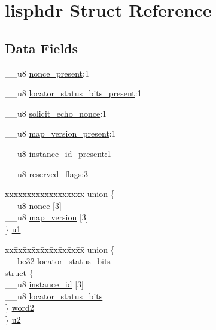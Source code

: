 \hypertarget{structlisphdr}{}\section{lisphdr Struct Reference}
\label{structlisphdr}
\subsection*{Data Fields}
\begin{DoxyCompactItemize}
\item 
\+\_\+\+\_\+u8 \hyperlink{structlisphdr_afc8757faa2d76be2f1d292828d29e109}{nonce\+\_\+present}\+:1
\item 
\+\_\+\+\_\+u8 \hyperlink{structlisphdr_a3499bf30411f687e5f2e052288718196}{locator\+\_\+status\+\_\+bits\+\_\+present}\+:1
\item 
\+\_\+\+\_\+u8 \hyperlink{structlisphdr_a6e67108cec8cf45f0662e9388eac60fd}{solicit\+\_\+echo\+\_\+nonce}\+:1
\item 
\+\_\+\+\_\+u8 \hyperlink{structlisphdr_a922cbf86c791d66583e991b87e65e601}{map\+\_\+version\+\_\+present}\+:1
\item 
\+\_\+\+\_\+u8 \hyperlink{structlisphdr_a35d40a5064b3f329708f3a57b1ea9856}{instance\+\_\+id\+\_\+present}\+:1
\item 
\+\_\+\+\_\+u8 \hyperlink{structlisphdr_a1a624b2a0b92d71d031c2e3c63f4eb99}{reserved\+\_\+flags}\+:3
\item 
\begin{tabbing}
xx\=xx\=xx\=xx\=xx\=xx\=xx\=xx\=xx\=\kill
union \{\\
\>\_\_u8 \hyperlink{structlisphdr_a02abd6cb7120a0217123dd14841b2d68}{nonce} \mbox{[}3\mbox{]}\\
\>\_\_u8 \hyperlink{structlisphdr_a1852af6ae00c14ed3e4509ebef75f312}{map\_version} \mbox{[}3\mbox{]}\\
\} \hyperlink{structlisphdr_a7ffea0f2cb943b1c56a92a4823c67fc3}{u1}\\

\end{tabbing}\item 
\begin{tabbing}
xx\=xx\=xx\=xx\=xx\=xx\=xx\=xx\=xx\=\kill
union \{\\
\>\_\_be32 \hyperlink{structlisphdr_a00ce4f1450100ac73fd8713835629db0}{locator\_status\_bits}\\
\>struct \{\\
\>\>\_\_u8 \hyperlink{structlisphdr_a486cbcb938afeadef534fa292fc90dd3}{instance\_id} \mbox{[}3\mbox{]}\\
\>\>\_\_u8 \hyperlink{structlisphdr_af9e8db4b8f0229a4edb6fc632fc896cd}{locator\_status\_bits}\\
\>\} \hyperlink{structlisphdr_a5a4d067fadb40535e26b1a0305f46db0}{word2}\\
\} \hyperlink{structlisphdr_a72f060d900466d19213fd5c473a8d6fd}{u2}\\


\end{tabbing}
\end{DoxyCompactItemize}
